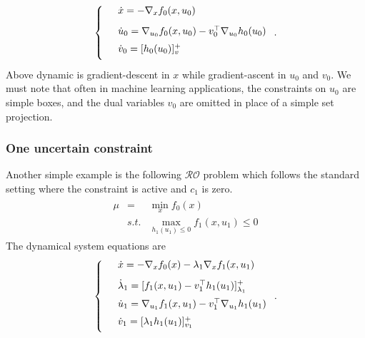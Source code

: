 \documentclass[journal,twoside,web]{ieeecolor}
\begin{document}
\begin{align*}
\left\{
\begin{array}{cl}
\vspace{3mm}
&\dot{x}=-\nabla_x f_0(x,u_0)\\
\vspace{2mm}
&\dot{u}_0=\nabla_{u_0}f_0(x,u_0)-v_0^\top \nabla_{u_0} h_0(u_0)\\
\vspace{2mm}
&\dot{v}_0=[h_0(u_0)]_v^+
\end{array}\right..
\end{align*}
Above dynamic is gradient-descent in $x$ while gradient-ascent in $u_0$ and $v_0$. We must note that often in machine learning applications, the constraints on $u_0$ are simple boxes, and the dual variables $v_0$ are omitted in place of a simple set projection.

\subsubsection{One uncertain constraint}
Another simple example is the following $\mathcal{RO}$ problem which follows the standard setting where the constraint is active and $c_1$ is zero.
\begin{align*}
\begin{array}{lcl}\mu&=&\displaystyle\min_x f_0(x)\\
&s.t.&\displaystyle \max_{h_1(u_1)\leq 0}f_1(x,u_1)\leq 0
\end{array}
\end{align*}
The dynamical system equations are
\begin{align*}
\left\{
\begin{array}{cl}
\vspace{3mm}
&\dot{x}=-\nabla_x f_0(x)-\lambda_1 \nabla_x f_1(x,u_1)\\
\vspace{2mm}
&\dot{\lambda}_1=[f_1(x,u_1)-v_1^\top h_1(u_1)]_{\lambda_1}^+\\
\vspace{2mm}
&\dot{u}_1=\nabla_{u_1} f_1(x,u_1)-v_1^\top \nabla_{u_1}h_1(u_1)\\
\vspace{2mm}
&\dot{v}_1=[\lambda_1h_1(u_1)]_{v_1}^+
\end{array}\right..
\end{align*}
\end{document}
